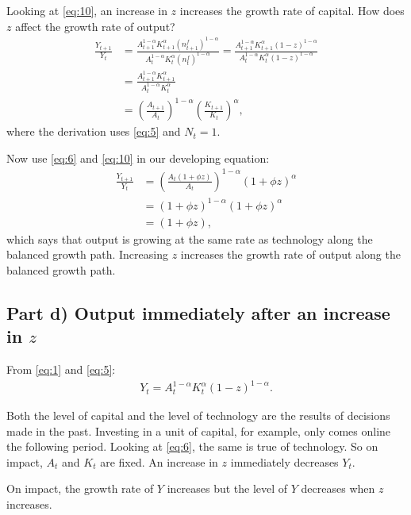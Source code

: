 \documentclass[12pt]{pracjourn_rwr}
\theoremstyle{definition}
\theoremstyle{remark}
\begin{document}
Looking at \eqref{eq:10}, an increase in $z$ increases the growth rate of capital.
How does $z$ affect the growth rate of output?
\begin{align*}
\frac{Y_{t+1}}{Y_{t}} &=
\frac{A_{t+1}^{1-\alpha}K_{t+1}^{\alpha} \left( n_{t+1}^{f} \right)^{1-\alpha}}{
  A_{t}^{1-\alpha}K_{t}^{\alpha} \left( n_{t}^{f} \right)^{1-\alpha}} =
\frac{A_{t+1}^{1-\alpha}K_{t+1}^{\alpha} \left( 1-z \right)^{1-\alpha}}{
  A_{t}^{1-\alpha}K_{t}^{\alpha} \left( 1-z \right)^{1-\alpha}} \\
&= \frac{A_{t+1}^{1-\alpha}K_{t+1}^{\alpha}}{A_{t}^{1-\alpha}K_{t}^{\alpha}} \\
&= \left( \frac{A_{t+1}}{A_{t}} \right)^{1-\alpha} \left( \frac{K_{t+1}}{K_{t}} \right)^{\alpha},
\end{align*}
where the derivation uses \eqref{eq:5} and $N_{t}= 1$.

Now use \eqref{eq:6} and \eqref{eq:10} in our developing equation:
\begin{align*}
\frac{Y_{t+1}}{Y_{t}} &=
\left( \frac{A_{t}\left( 1+\phi z \right)}{A_{t}} \right)^{1-\alpha} \left( 1+\phi z \right)^{\alpha} \\
&= \left( 1+\phi z \right)^{1-\alpha} \left( 1+\phi z \right)^{\alpha} \\
&= \left( 1+\phi z \right),
\end{align*}
which says that output is growing at the same rate as technology along the balanced growth path.
Increasing $z$ increases the growth rate of output along the balanced growth path.

\subsection{Part d) Output immediately after an increase in $z$}

From \eqref{eq:1} and \eqref{eq:5}:
\begin{align*}
Y_{t} = A_{t}^{1-\alpha}K_{t}^{\alpha}(1-z)^{1-\alpha}.
\end{align*}

Both the level of capital and the level of technology are the results of decisions made in the past.
Investing in a unit of capital, for example, only comes online the following period.
Looking at \eqref{eq:6}, the same is true of technology.
So on impact, $A_{t}$ and $K_{t}$ are fixed.
An increase in $z$ immediately decreases $Y_{t}$.

On impact, the growth rate of $Y$ increases but the level of $Y$ decreases when $z$ increases. 
\end{document}
